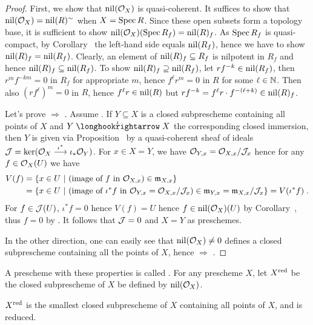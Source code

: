 \documentclass[a4paper,parskip=half,numbers=enddot, DIV=12]{scrreprt}
\begin{document}
\begin{proof}
    First, we show that $\operatorname{nil}(\mathcal{O}_X)$ is quasi-coherent. It suffices to show that $\operatorname{nil}(\mathcal{O}_X) = \operatorname{nil}(R)^\sim$ when $X=\operatorname{Spec} R$. Since these open subsets form a topology base, it is sufficient to show $\operatorname{nil}(\mathcal{O}_X)(\operatorname{Spec} R_f) = \operatorname{nil}(R)_f$. As $\operatorname{Spec} R_f$ is quasi-compact, by Corollary~ the left-hand side equals $\operatorname{nil}(R_f)$, hence we have to show $\operatorname{nil}(R)_f = \operatorname{nil}(R_f)$. Clearly, an element of $\operatorname{nil}(R)_f\subseteq R_f$ is nilpotent in $R_f$ and hence $\operatorname{nil}(R)_f\subseteq\operatorname{nil}(R_f)$. To show $\operatorname{nil}(R)_f\supseteq\operatorname{nil}(R_f)$, let $rf^{-k}\in \operatorname{nil}(R_f)$, then $r^mf^{-km} = 0$ in $R_f$ for appropriate $m$, hence $f^\ell r^m = 0$ in $R$ for some $\ell\in\mathbb{N}$. Then also $(rf^\ell)^m = 0$ in $R$, hence $f^\ell r\in \operatorname{nil}(R)$ but $rf^{-k}=f^\ell r\cdot f^{-(\ell+k)}\in \operatorname{nil}(R)_f$.
    
    Let's prove  $\Rightarrow$ . Assume . If $Y\subseteq X$ is a closed subprescheme containing all points of $X$ and $Y\monomorphism[\iota]X$ the corresponding closed immersion, then $Y$ is given via Proposition~ by a quasi-coherent sheaf of ideals $\Jj=\ker(\Oo_X\morphism[\iota^*]\iota_*\Oo_Y)$. For $x\in X=Y$, we have $\mathcal{O}_{Y,x}= \mathcal{O}_{X,x}/\mathcal{J}_x$ hence for any $f\in \mathcal{O}_X(U)$ we have
    \begin{align*}
    	V(f) &= \left\{x\in U\ \middle|\  (\text{image of }f\text{ in }\mathcal{O}_{X,x})\in\mathfrak{m}_{X,x}\right\}\\
    	&= \left\{x\in U\ \middle|\  (\text{image of }\iota^*f\text{ in }\mathcal{O}_{Y,x}=\mathcal{O}_{X,x}/\mathcal{J}_x)\in\mathfrak{m}_{Y,x}=\mathfrak{m}_{X,x}/\mathcal{J}_x\right\}=V(\iota^*f)\;.
    \end{align*}
     For $f\in \mathcal{J}(U)$, $\iota^*f = 0$ hence $V(f) = U$ hence $f\in \operatorname{nil}(\mathcal{O}_X)(U)$ by Corollary~, thus $f=0$ by . It follows that $\mathcal{J}=0$ and $X=Y$ as preschemes.
    
    In the other direction, one can easily see that $\operatorname{nil}(\mathcal{O}_X) \neq 0$ defines a closed subprescheme containing all the points of $X$, hence  $\Rightarrow$ .
\end{proof}
\begin{defi} 
    A prescheme with these properties is called . For any prescheme $X$, let $X^{\mathrm{red}}$ be the closed subprescheme of $X$ be defined by $\operatorname{nil}(\mathcal{O}_X)$.
\end{defi}
\begin{rem}
    $X^{\mathrm{red}}$ is the smallest closed subprescheme of $X$ containing all points of $X$, and is reduced.
\end{rem}
\end{document}
